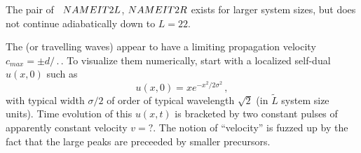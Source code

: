 The pair of \reqva\ 
${NAMEIT}2L$,
${NAMEIT}2R$
exists for larger system sizes, but does not continue 
adiabatically down to $L=22$.

The \reqva (or travelling waves) appear to have a limiting propagation
velocity $c_{max} = \pm d/\period{}$. 
To visualize them numerically,
start with a localized self-dual $u(x,0)$ such as
\[
u(x,0) = x e^{- x^2/2\sigma^2}
\,,
\]
with typical width $\sigma/2$ of order of typical wavelength 
$\sqrt{2}$ (in $\tilde{L}$ system size units).
Time evolution of this  $u(x,t)$ is bracketed by two constant 
pulses of apparently constant velocity $v=?$.
The notion of ``velocity''
is fuzzed up by the fact that the large peaks are preceeded
by smaller precursors.


